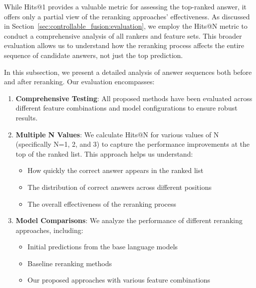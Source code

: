 While Hits@1 provides a valuable metric for assessing the top-ranked answer, it offers only a partial view of the reranking approaches' effectiveness. As discussed in Section~\ref{sec:controllable_fusion:evaluation}, we employ the Hits@N metric to conduct a comprehensive analysis of all rankers and feature sets. This broader evaluation allows us to understand how the reranking process affects the entire sequence of candidate answers, not just the top prediction.

In this subsection, we present a detailed analysis of answer sequences both before and after reranking. Our evaluation encompasses:

\begin{enumerate}
    \item \textbf{Comprehensive Testing}: All proposed methods have been evaluated across different feature combinations and model configurations to ensure robust results.
    
    \item \textbf{Multiple N Values}: We calculate Hits@N for various values of N (specifically N=1, 2, and 3) to capture the performance improvements at the top of the ranked list. This approach helps us understand:
    \begin{itemize}
        \item How quickly the correct answer appears in the ranked list
        \item The distribution of correct answers across different positions
        \item The overall effectiveness of the reranking process
    \end{itemize}
    
    \item \textbf{Model Comparisons}: We analyze the performance of different reranking approaches, including:
    \begin{itemize}
        \item Initial predictions from the base language models
        \item Baseline reranking methods
        \item Our proposed approaches with various feature combinations
    \end{itemize}
\end{enumerate}


